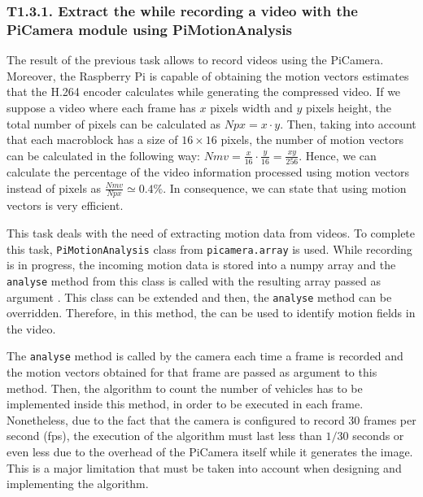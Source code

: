 

\subsubsection{T1.3.1. Extract the  while recording a video with the PiCamera module using PiMotionAnalysis}
The result of the previous task allows to record videos using the PiCamera. Moreover, the Raspberry Pi is capable of obtaining the motion vectors estimates that the H.264 encoder calculates while generating the compressed video. If we suppose a video where each frame has $x$ pixels width and $y$ pixels height, the total number of pixels can be calculated as $ Npx = x\cdot y $. Then, taking into account that each macroblock has a size of $16\times16$ pixels, the number of motion vectors can be calculated in the following way:
$ Nmv = \frac { x }{ 16 } \cdot \frac { y }{ 16 } =\frac { xy }{ 256 } $. 
Hence, we can calculate the percentage of the video information processed using motion vectors instead of pixels as
$ \frac { Nmv }{ Npx } \simeq 0.4\% $. In consequence, we can state that using motion vectors is very efficient.

This task deals with the need of extracting motion data from videos. To complete this task, \texttt{PiMotionAnalysis} class from \texttt{picamera.array} is used. While recording is in progress, the incoming motion data is stored into a numpy array and the \texttt{analyse} method from this class is called with the resulting array passed as argument \cite{PiCameraDoc}. This class can be extended and then, the \texttt{analyse} method can be overridden. Therefore, in this method, the  can be used to identify motion fields in the video.

The \texttt{analyse} method is called by the camera each time a frame is recorded and the motion vectors obtained for that frame are passed as argument to this method. Then, the algorithm to count the number of vehicles has to be implemented inside this method, in order to be executed in each frame. Nonetheless, due to the fact that the camera is configured to record 30 frames per second (fps), the execution of the algorithm must last less than $1/30$ seconds or even less due to the overhead of the PiCamera itself while it generates the image. This is a major limitation that must be taken into account when designing and implementing the algorithm.

